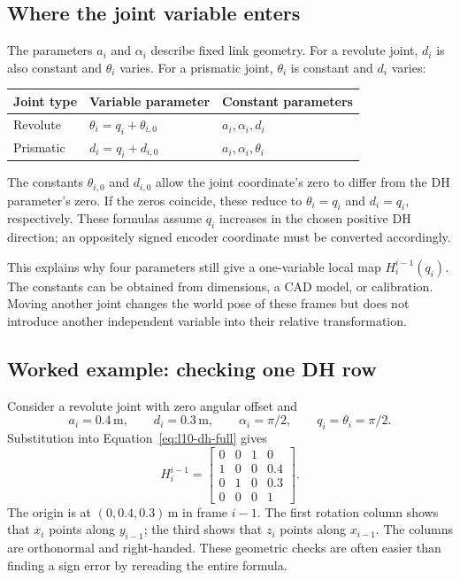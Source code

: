 \subsection{Where the joint variable enters}
The parameters $a_i$ and $\alpha_i$ describe fixed link geometry.
For a revolute joint, $d_i$ is also constant and $\theta_i$ varies.
For a prismatic joint, $\theta_i$ is constant and $d_i$ varies:
\begin{center}
\begin{tabular}{lll}
\toprule
Joint type & Variable parameter & Constant parameters\\
\midrule
Revolute & $\theta_i=q_i+\theta_{i,0}$ & $a_i,\alpha_i,d_i$\\
Prismatic & $d_i=q_i+d_{i,0}$ & $a_i,\alpha_i,\theta_i$\\
\bottomrule
\end{tabular}
\end{center}
The constants $\theta_{i,0}$ and $d_{i,0}$ allow the joint coordinate's
zero to differ from the DH parameter's zero. If the zeros coincide,
these reduce to $\theta_i=q_i$ and $d_i=q_i$, respectively. These formulas
assume $q_i$ increases in the chosen positive DH direction; an oppositely
signed encoder coordinate must be converted accordingly.

This explains why four parameters still give a one-variable local map
$H_i^{i-1}(q_i)$. The constants can be obtained from dimensions, a CAD
model, or calibration. Moving another joint changes the world pose of
these frames but does not introduce another independent variable into
their relative transformation.

\subsection{Worked example: checking one DH row}
Consider a revolute joint with zero angular offset and
\[
 a_i=0.4\,\mathrm m,\qquad d_i=0.3\,\mathrm m,\qquad
 \alpha_i=\pi/2,\qquad q_i=\theta_i=\pi/2.
\]
Substitution into Equation~\eqref{eq:l10-dh-full} gives
\[
 H_i^{i-1}=\begin{bmatrix}
 0&0&1&0\\1&0&0&0.4\\0&1&0&0.3\\0&0&0&1
 \end{bmatrix}.
\]
The origin is at $(0,0.4,0.3)\,\mathrm m$ in frame $i-1$.
The first rotation column shows that $x_i$ points along $y_{i-1}$;
the third shows that $z_i$ points along $x_{i-1}$. The columns are
orthonormal and right-handed. These geometric checks are often easier
than finding a sign error by rereading the entire formula.

